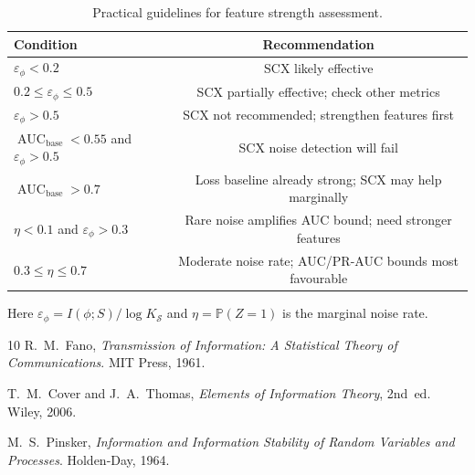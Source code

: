 \begin{table}[h]
\centering
\caption{Practical guidelines for feature strength assessment.}
\label{tab:diagnostic-thresholds}
\begin{tabular}{lc}
\toprule
Condition & Recommendation \\
\midrule
$\varepsilon_\phi < 0.2$            & SCX likely effective \\
$0.2 \leq \varepsilon_\phi \leq 0.5$ & SCX partially effective; check other metrics \\
$\varepsilon_\phi > 0.5$            & SCX not recommended; strengthen features first \\
$\operatorname{AUC}_{\text{base}} < 0.55$ and $\varepsilon_\phi > 0.5$
                                    & SCX noise detection will fail \\
$\operatorname{AUC}_{\text{base}} > 0.7$
                                    & Loss baseline already strong; SCX may help marginally \\
$\eta < 0.1$ and $\varepsilon_\phi > 0.3$
                                    & Rare noise amplifies AUC bound; need stronger features \\
$0.3 \leq \eta \leq 0.7$           & Moderate noise rate; AUC/PR-AUC bounds most favourable \\
\bottomrule
\end{tabular}
\end{table}

Here $\varepsilon_\phi = I(\phi; S) / \log K_{\mathcal{S}}$ and
$\eta = \mathbb{P}(Z=1)$ is the marginal noise rate.

\begin{thebibliography}{10}
R.~M.~Fano, \emph{Transmission of Information: A Statistical Theory of
Communications}. MIT Press, 1961.

T.~M.~Cover and J.~A.~Thomas, \emph{Elements of Information Theory}, 2nd~ed.
Wiley, 2006.

M.~S.~Pinsker, \emph{Information and Information Stability of Random Variables
and Processes}. Holden-Day, 1964.
\end{thebibliography}

\endinput
